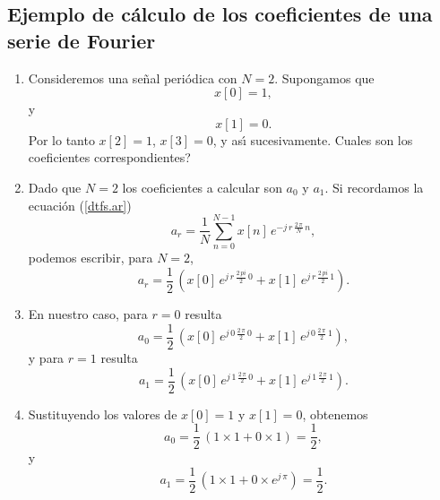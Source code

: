 \subsection{Ejemplo de c\'{a}lculo de los coeficientes de una serie de Fourier}
\begin{enumerate}
\item Consideremos una se\~{n}al peri\'{o}dica con $N = 2$. Supongamos que 
\begin{equation}
x[0] = 1,
\end{equation} y 
\begin{equation}
x[1] = 0.
\end{equation}
Por lo tanto $x[2] = 1$, $x[3] = 0$, y as\'{\i} sucesivamente. \textquestiondown Cuales son los coeficientes correspondientes?

\item Dado que $N = 2$ los coeficientes a calcular son $a_{0}$ y $a_{1}$. Si recordamos la ecuaci\'{o}n (\ref{dtfs.ar}) 
\begin{equation}
   a_{r} = \frac{1}{N}\sum_{n=0}^{N-1}x\left[ n\right] \, e^{-j \, r \, \frac{2 \, \pi }{N} \, n},
\end{equation}
podemos escribir, para $N = 2$,
\begin{equation}
a_{r} = \frac{1}{2} \, 
\left(x[0] \, e^{j \, r \, \frac{2 \, pi}{2} \, 0} + x[1] \, e^{j \, r \, \frac{2 \, pi}{2} \, 1}\right). 
\end{equation}

\item En nuestro caso, para $r = 0$ resulta
\begin{equation}
a_{0} = \frac{1}{2} \, \left( 
x[0] \, e^{j \, 0 \, \frac{2 \, \pi}{2} \, 0} +
x[1] \, e^{j \, 0 \, \frac{2 \, \pi}{2} \, 1} 
\right),
\end{equation}
y para $r = 1$ resulta
\begin{equation}
a_{1} = \frac{1}{2} \, \left( 
x[0] \, e^{j \, 1 \, \frac{2 \, \pi}{2} \, 0} +
x[1] \, e^{j \, 1 \, \frac{2 \, \pi}{2} \, 1} 
\right).
\end{equation}

\item Sustituyendo los valores de $x[0] = 1$ y $x[1] = 0$, obtenemos
\begin{equation}
a_{0} = \frac{1}{2} \, \left( 
1 \times 1 +
0 \times 1
\right) = \frac{1}{2},
\end{equation}
y
\begin{equation}
a_{1} = \frac{1}{2} \, \left( 
1 \times 1 +
0 \times e^{j \, \pi} 
\right) = \frac{1}{2}.
\end{equation}
\end{enumerate}

